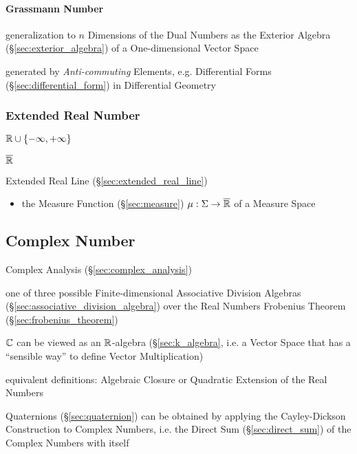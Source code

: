 \paragraph{Grassmann Number}\label{sec:grassmann_number}\hfill

generalization to $n$ Dimensions of the Dual Numbers as the Exterior Algebra
(\S\ref{sec:exterior_algebra}) of a One-dimensional Vector Space

generated by \emph{Anti-commuting} Elements, e.g. Differential Forms
(\S\ref{sec:differential_form}) in Differential Geometry



\subsubsection{Extended Real Number}\label{sec:extended_real}

$\mathbb{R} \cup \{-\infty, +\infty\}$

$\overline{\mathbb{R}}$

Extended Real Line (\S\ref{sec:extended_real_line})

\begin{itemize}
  \item the Measure Function (\S\ref{sec:measure}) $\mu : \Sigma \rightarrow
    \overline{\mathbb{R}}$ of a Measure Space
\end{itemize}



\subsection{Complex Number}\label{sec:complex_number}

\fist Complex Analysis (\S\ref{sec:complex_analysis})

one of three possible Finite-dimensional Associative Division Algebras
(\S\ref{sec:associative_division_algebra}) over the Real Numbers \fist
Frobenius Theorem (\S\ref{sec:frobenius_theorem})

$\mathbb{C}$ can be viewed as an $\mathbb{R}$-algebra (\S\ref{sec:k_algebra}, i.e. a
Vector Space that has a ``sensible way'' to define Vector Multiplication)

equivalent definitions: Algebraic Closure or Quadratic Extension of
the Real Numbers

Quaternions (\S\ref{sec:quaternion}) can be obtained by applying the
Cayley-Dickson Construction to Complex Numbers, i.e. the Direct Sum
(\S\ref{sec:direct_sum}) of the Complex Numbers with itself

